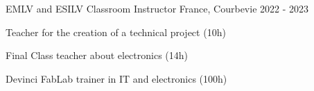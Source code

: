 \begin{cventries}
  \cventry
    {EMLV and ESILV} %
    {Classroom Instructor} %
    {France, Courbevie} %
    {2022 - 2023} %
    {
      \begin{cvitems} %
        \item {Teacher for the creation of a technical project (10h)}
        \item {Final Class teacher about electronics (14h)}
        \item {Devinci FabLab trainer in IT and electronics (100h)}
      \end{cvitems}
    }
    {}

\end{cventries}

